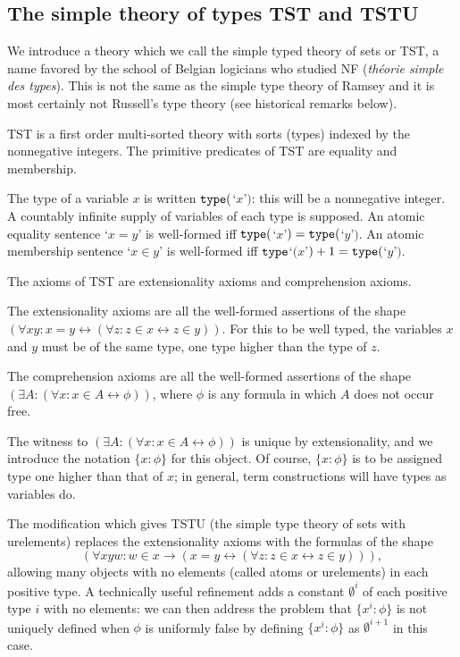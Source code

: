 \documentclass[112pt]{article}
\begin{document}
\subsection{The simple theory of types TST and TSTU}

We introduce a theory which we call the simple typed theory of sets or TST, a name favored by the school of Belgian logicians who studied NF ({\em th\'eorie simple des types}).  This is not the same as the simple type theory of Ramsey and it is most certainly not Russell's type theory  (see historical remarks below).

TST is a first order multi-sorted theory with sorts (types) indexed by the nonnegative integers.  The primitive predicates of TST are equality and membership.

The type of a variable $x$ is written ${\tt type}($`$x$'$)$:  this will be a nonnegative integer.   A countably infinite supply of variables of each type is supposed.  An atomic equality sentence `$x=y$' is well-formed iff ${\tt type}($`$x$'$)={\tt type}($`$y$'$)$.
An atomic membership sentence `$x \in y$' is well-formed iff ${\tt type}$`$(x$'$)+1 = {\tt type}($`$y$'$)$.

The axioms of TST are extensionality axioms and comprehension axioms.

The extensionality axioms are all the well-formed assertions of the shape $(\forall xy:x=y \leftrightarrow (\forall z:z \in x \leftrightarrow z\in y))$.  For this to be well typed, the variables
$x$ and $y$ must be of the same type, one type higher than the type of $z$.

The comprehension axioms are all the well-formed assertions of the shape $(\exists A:(\forall x:x \in A \leftrightarrow \phi))$, where $\phi$ is any formula in which $A$ does not occur free.

The witness to $(\exists A:(\forall x:x \in A \leftrightarrow \phi))$ is unique by extensionality, and we introduce the notation $\{x:\phi\}$ for this object.  Of course, $\{x:\phi\}$  is to be assigned type one higher than that of $x$;  in general, term constructions will have types as variables do.

The modification which gives TSTU (the simple type theory of sets with urelements) replaces the extensionality axioms with the formulas of the shape $$(\forall xyw:w \in x \rightarrow (x=y \leftrightarrow (\forall z:z \in x \leftrightarrow z\in y))),$$  allowing many objects with no elements (called atoms or urelements)  in each positive type.  A technically useful refinement adds a constant $\emptyset^i$ of each positive type $i$ with no elements:  we can then address the problem that $\{x^i:\phi\}$ is not uniquely defined when $\phi$ is uniformly false by defining $\{x^i:\phi\}$ as $\emptyset^{i+1}$ in this case.
\end{document}
